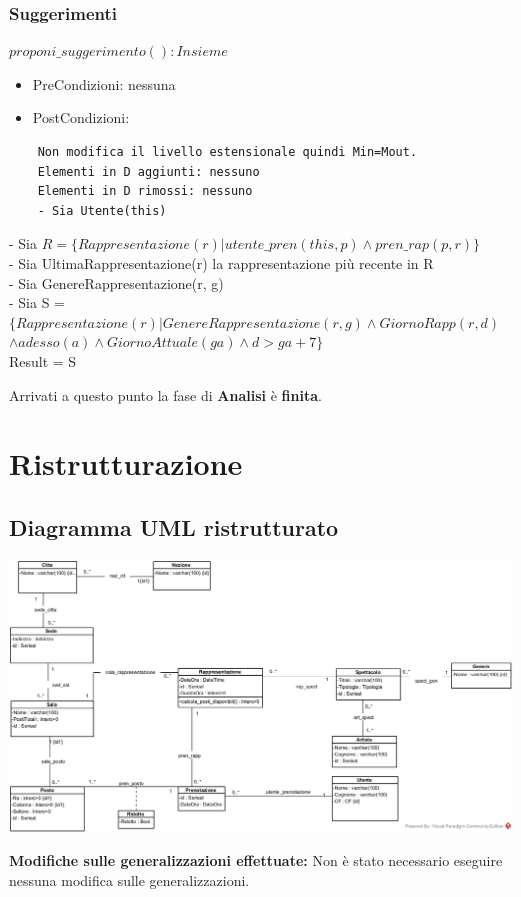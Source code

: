 \documentclass[12pt, letterpaper]{article}
\begin{document}
\subsubsection{Suggerimenti}
$proponi\_suggerimento(): Insieme$
\begin{itemize}
    \item PreCondizioni: nessuna
    \item PostCondizioni:
\end{itemize}
\begin{verbatim}
    Non modifica il livello estensionale quindi Min=Mout.
    Elementi in D aggiunti: nessuno
    Elementi in D rimossi: nessuno
    - Sia Utente(this)\end{verbatim}
    - Sia $R= \{Rappresentazione(r) | utente\_pren(this,p) \land pren\_rap(p,r)\}$\\

    - Sia UltimaRappresentazione(r) la rappresentazione più recente in R\\
    - Sia GenereRappresentazione(r, g)\\
    - Sia S =$ \{Rappresentazione(r) | GenereRappresentazione(r,g) \land GiornoRapp(r,d)$ \\
        $\land adesso(a) \land GiornoAttuale(ga) \land d>ga+7\}$\\
    Result = S
    \newpage




Arrivati a questo punto la fase di \textbf{Analisi} è \textbf{finita}.
\section{Ristrutturazione}
\subsection{Diagramma UML ristrutturato}
\begin{center}
    \includegraphics[width=1\textwidth ]{Images/UMLRistrutturato.jpg}
\end{center} \newpage
\textbf{Modifiche sulle generalizzazioni effettuate:}
Non è stato necessario eseguire nessuna modifica sulle generalizzazioni.
\end{document}
